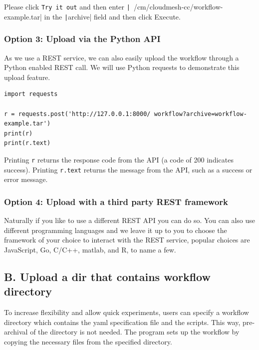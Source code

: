 Please click \texttt{Try\ it\ out} and then enter \newline
\texttt|~/cm/cloudmesh-cc/workflow-example.tar| in the
\texttt|archive| field and then click Execute.

\subsubsection{Option 3: Upload via the Python
API}\label{option-3-upload-via-the-python-api}

As we use a REST service, we can also easily upload the workflow through
a Python enabled REST call. We will use Python requests to demonstrate
this upload feature.

\smallskip
\begin{verbatim}
import requests

r = requests.post('http://127.0.0.1:8000/ workflow?archive=workflow-example.tar')
print(r)
print(r.text)
\end{verbatim}
\smallskip

Printing \texttt{r} returns the response code from the API (a code of
200 indicates success). Printing \texttt{r.text} returns the message
from the API, such as a success or error message.

\subsubsection{Option 4: Upload with a third party REST
framework}\label{option-4-upload-with-a-third-party-rest-framework}

Naturally if you like to use a different REST API you can do so. You can
also use different programming languages and we leave it up to you to
choose the framework of your choice to interact with the REST service,
popular choices are JavaScript, Go, C/C++, matlab, and R, to name a few.

\subsection{B. Upload a dir that contains workflow
directory}\label{b.-upload-a-dir-that-contains-workflow-directory}

To increase flexibility and allow quick experiments, users can specify a
workflow directory which contains the yaml specification file and the
scripts. This way, pre-archival of the directory is not needed. The
program sets up the workflow by copying the necessary files from the
specified directory.

